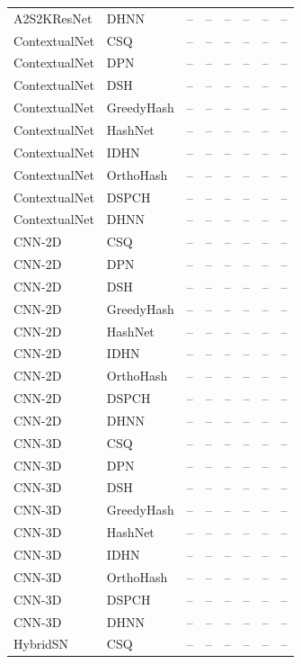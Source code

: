 \begin{longtable}{llrrrrrr}
A2S2KResNet & DHNN & -- & -- & -- & -- & -- & -- \\
\addlinespace
ContextualNet & CSQ & -- & -- & -- & -- & -- & -- \\
ContextualNet & DPN & -- & -- & -- & -- & -- & -- \\
ContextualNet & DSH & -- & -- & -- & -- & -- & -- \\
ContextualNet & GreedyHash & -- & -- & -- & -- & -- & -- \\
ContextualNet & HashNet & -- & -- & -- & -- & -- & -- \\
ContextualNet & IDHN & -- & -- & -- & -- & -- & -- \\
ContextualNet & OrthoHash & -- & -- & -- & -- & -- & -- \\
ContextualNet & DSPCH & -- & -- & -- & -- & -- & -- \\
ContextualNet & DHNN & -- & -- & -- & -- & -- & -- \\
\addlinespace
CNN-2D & CSQ & -- & -- & -- & -- & -- & -- \\
CNN-2D & DPN & -- & -- & -- & -- & -- & -- \\
CNN-2D & DSH & -- & -- & -- & -- & -- & -- \\
CNN-2D & GreedyHash & -- & -- & -- & -- & -- & -- \\
CNN-2D & HashNet & -- & -- & -- & -- & -- & -- \\
CNN-2D & IDHN & -- & -- & -- & -- & -- & -- \\
CNN-2D & OrthoHash & -- & -- & -- & -- & -- & -- \\
CNN-2D & DSPCH & -- & -- & -- & -- & -- & -- \\
CNN-2D & DHNN & -- & -- & -- & -- & -- & -- \\
\addlinespace
CNN-3D & CSQ & -- & -- & -- & -- & -- & -- \\
CNN-3D & DPN & -- & -- & -- & -- & -- & -- \\
CNN-3D & DSH & -- & -- & -- & -- & -- & -- \\
CNN-3D & GreedyHash & -- & -- & -- & -- & -- & -- \\
CNN-3D & HashNet & -- & -- & -- & -- & -- & -- \\
CNN-3D & IDHN & -- & -- & -- & -- & -- & -- \\
CNN-3D & OrthoHash & -- & -- & -- & -- & -- & -- \\
CNN-3D & DSPCH & -- & -- & -- & -- & -- & -- \\
CNN-3D & DHNN & -- & -- & -- & -- & -- & -- \\
\addlinespace
HybridSN & CSQ & -- & -- & -- & -- & -- & -- \\

\end{longtable}
